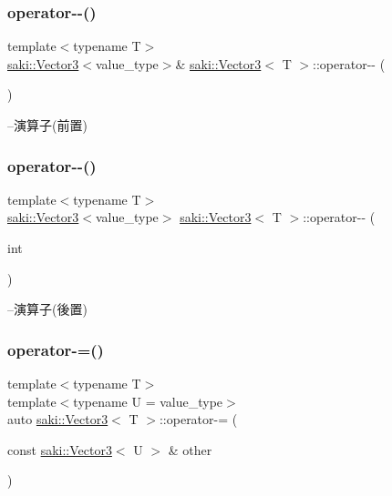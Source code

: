 \subsubsection{\texorpdfstring{operator-\/-\/()}{operator--()}\hspace{0.1cm}{\footnotesize\ttfamily [1/2]}}
{\footnotesize\ttfamily template$<$typename T$>$ \\
\mbox{\hyperlink{classsaki_1_1_vector3}{saki\+::\+Vector3}}$<$value\+\_\+type$>$\& \mbox{\hyperlink{classsaki_1_1_vector3}{saki\+::\+Vector3}}$<$ T $>$\+::operator-\/-\/ (\begin{DoxyParamCaption}{ }\end{DoxyParamCaption})\hspace{0.3cm}{\ttfamily [inline]}}



--演算子(前置) 

\mbox{\label{classsaki_1_1_vector3_aca7964efb09798828f3b8150c76609a6}} 
\subsubsection{\texorpdfstring{operator-\/-\/()}{operator--()}\hspace{0.1cm}{\footnotesize\ttfamily [2/2]}}
{\footnotesize\ttfamily template$<$typename T$>$ \\
\mbox{\hyperlink{classsaki_1_1_vector3}{saki\+::\+Vector3}}$<$value\+\_\+type$>$ \mbox{\hyperlink{classsaki_1_1_vector3}{saki\+::\+Vector3}}$<$ T $>$\+::operator-\/-\/ (\begin{DoxyParamCaption}\item[{int}]{ }\end{DoxyParamCaption})\hspace{0.3cm}{\ttfamily [inline]}}



--演算子(後置) 

\mbox{\label{classsaki_1_1_vector3_a9ffa8f65834570566ab89d2e1b511f52}} 
\subsubsection{\texorpdfstring{operator-\/=()}{operator-=()}}
{\footnotesize\ttfamily template$<$typename T$>$ \\
template$<$typename U  = value\+\_\+type$>$ \\
auto \mbox{\hyperlink{classsaki_1_1_vector3}{saki\+::\+Vector3}}$<$ T $>$\+::operator-\/= (\begin{DoxyParamCaption}\item[{const \mbox{\hyperlink{classsaki_1_1_vector3}{saki\+::\+Vector3}}$<$ U $>$ \&}]{other }\end{DoxyParamCaption})\hspace{0.3cm}{\ttfamily [inline]}}




